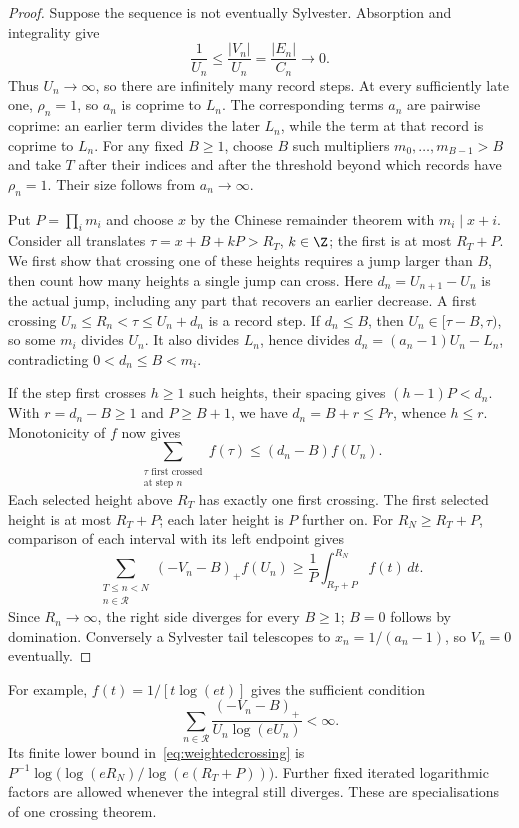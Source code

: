 \documentclass[11pt]{article}
\begin{document}
\begin{proof}
Suppose the sequence is not eventually Sylvester. Absorption and
integrality give
\[
 \frac1{U_n}\le\frac{|V_n|}{U_n}=\frac{|E_n|}{C_n}\longrightarrow0.
\]
Thus $U_n\to\infty$, so there are infinitely many record steps. At every sufficiently late one,
$\rho_n=1$, so $a_n$ is coprime to $L_n$.
The corresponding terms $a_n$ are pairwise coprime: an earlier term divides
the later $L_n$, while the term at that record is coprime to $L_n$.
For any fixed $B\ge1$, choose $B$ such multipliers
$m_0,\ldots,m_{B-1}>B$ and take $T$ after their indices and after the
threshold beyond which records have $\rho_n=1$. Their size follows from
$a_n\to\infty$.

Put $P=\prod_i m_i$ and choose $x$ by the Chinese remainder theorem with
$m_i\mid x+i$. Consider all translates $\tau=x+B+kP>R_T$, $k\in\Z$;
the first is at most $R_T+P$. We first show that crossing one of these
heights requires a jump larger than $B$, then count how many heights a
single jump can cross. Here $d_n=U_{n+1}-U_n$ is the actual jump,
including any part that recovers an earlier decrease.
A first crossing $U_n\le R_n<\tau\le U_n+d_n$ is a record step.
If $d_n\le B$, then
$U_n\in[\tau-B,\tau)$, so some $m_i$ divides $U_n$. It also divides
$L_n$, hence divides $d_n=(a_n-1)U_n-L_n$, contradicting
$0<d_n\le B<m_i$.

If the step first crosses $h\ge1$ such heights, their spacing gives
$(h-1)P<d_n$. With $r=d_n-B\ge1$ and $P\ge B+1$, we have
$d_n=B+r\le Pr$, whence $h\le r$. Monotonicity of $f$ now gives
\[
 \sum_{\substack{\tau\text{ first crossed}\\\text{at step }n}}f(\tau)
 \le(d_n-B)f(U_n).
\]
Each selected height above $R_T$ has exactly one first crossing. The first
selected height is at most $R_T+P$; each later height is $P$ further on.
For $R_N\ge R_T+P$, comparison of each interval with its left endpoint gives
\begin{equation}\label{eq:weightedcrossing}
 \sum_{\substack{T\le n<N\\n\in\mathcal R}}(-V_n-B)_+f(U_n)
 \ge\frac1P\int_{R_T+P}^{R_N} f(t)\,dt.
\end{equation}
Since $R_n\to\infty$, the right side diverges for every $B\ge1$;
$B=0$ follows by domination. Conversely a Sylvester tail telescopes to
$x_n=1/(a_n-1)$, so $V_n=0$ eventually.
\end{proof}

For example, $f(t)=1/[t\log(et)]$ gives the sufficient condition
\[
 \sum_{n\in\mathcal R}\frac{(-V_n-B)_+}{U_n\log(eU_n)}<\infty.
\]
Its finite lower bound in~\eqref{eq:weightedcrossing} is
$P^{-1}\log\bigl(\log(eR_N)/\log(e(R_T+P))\bigr)$.
Further fixed iterated logarithmic factors are allowed whenever the integral
still diverges. These are specialisations of one crossing theorem.
\end{document}
